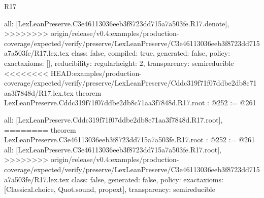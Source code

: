 \begin{lexlean}{R17}
\begin{coremodule}
{{{{{  all: [LexLeanPreserve.C3e46113036eeb3f8723dd715a7a503fe.R17.denote],
>>>>>>>> origin/release/v0.4:examples/production-coverage/expected/verify/preserve/LexLeanPreserve/C3e46113036eeb3f8723dd715a7a503fe/R17.lex.tex
  class: false,
  compiled: true,
  generated: false,
  policy: exact{axioms: []},
  reducibility: regular{height: 2},
  transparency: semireducible
}
<<<<<<<< HEAD:examples/production-coverage/expected/verify/preserve/LexLeanPreserve/Cddc319f71f07ddbe2db8c71aa3f7848d/R17.lex.tex
theorem LexLeanPreserve.Cddc319f71f07ddbe2db8c71aa3f7848d.R17.root : @252 := @261 {
  all: [LexLeanPreserve.Cddc319f71f07ddbe2db8c71aa3f7848d.R17.root],
========
theorem LexLeanPreserve.C3e46113036eeb3f8723dd715a7a503fe.R17.root : @252 := @261 {
  all: [LexLeanPreserve.C3e46113036eeb3f8723dd715a7a503fe.R17.root],
>>>>>>>> origin/release/v0.4:examples/production-coverage/expected/verify/preserve/LexLeanPreserve/C3e46113036eeb3f8723dd715a7a503fe/R17.lex.tex
  class: false,
  generated: false,
  policy: exact{axioms: [Classical.choice, Quot.sound, propext]},
  transparency: semireducible
}

}}}}}
\end{coremodule}
\end{lexlean}
